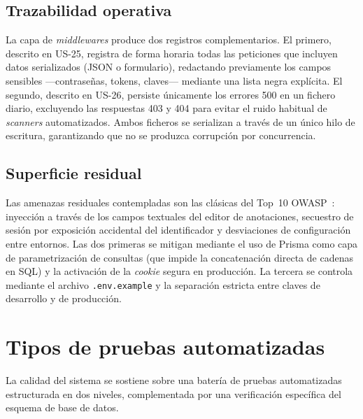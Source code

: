 \subsection{Trazabilidad operativa}
La capa de \textit{middlewares} produce dos registros complementarios. El
primero, descrito en US-25, registra de forma horaria todas las peticiones que
incluyen datos serializados (JSON o formulario), redactando previamente los
campos sensibles ---contraseñas, tokens, claves--- mediante una lista negra
explícita. El segundo, descrito en US-26, persiste únicamente los errores 500
en un fichero diario, excluyendo las respuestas 403 y 404 para evitar el ruido
habitual de \textit{scanners} automatizados. Ambos ficheros se serializan a
través de un único hilo de escritura, garantizando que no se produzca
corrupción por concurrencia.

\subsection{Superficie residual}
Las amenazas residuales contempladas son las clásicas del Top~10
OWASP~\cite{OWASPTop10_2021}: inyección a través de los campos textuales del
editor de anotaciones, secuestro de sesión por exposición accidental del
identificador y desviaciones de configuración entre entornos. Las dos primeras
se mitigan mediante el uso de Prisma como capa de parametrización de consultas
(que impide la concatenación directa de cadenas en SQL) y la activación de la
\textit{cookie} segura en producción. La tercera se controla mediante el
archivo \texttt{.env.example} y la separación estricta entre claves de
desarrollo y de producción.

\section{Tipos de pruebas automatizadas}

La calidad del sistema se sostiene sobre una batería de pruebas automatizadas
estructurada en dos niveles, complementada por una verificación específica del
esquema de base de datos.

